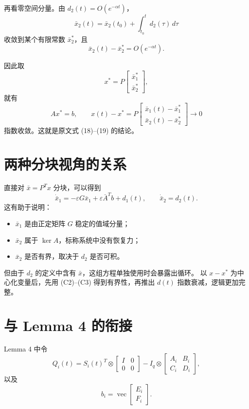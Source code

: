 \documentclass[UTF8,fontset=fandol]{ctexart}
\begin{document}
再看零空间分量。由 $d_2(t)=O(e^{-\alpha t})$，
\[
\bar{x}_2(t)
=\bar{x}_2(t_0)+\int_{t_0}^t d_2(\tau)\,d\tau
\]
收敛到某个有限常数 $\bar{x}_2^*$，且
\[
\bar{x}_2(t)-\bar{x}_2^*=O(e^{-\alpha t}).
\]

因此取
\[
x^*=P
\begin{bmatrix}
\bar{x}_1^*\\
\bar{x}_2^*
\end{bmatrix},
\]
就有
\[
Ax^*=b,\qquad
x(t)-x^*
=P
\begin{bmatrix}
\bar{x}_1(t)-\bar{x}_1^*\\
\bar{x}_2(t)-\bar{x}_2^*
\end{bmatrix}
\to0
\]
指数收敛。这就是原文式 (18)--(19) 的结论。

\section{两种分块视角的关系}

直接对 $\bar{x}=P^{T}x$ 分块，可以得到
\[
\dot{\bar{x}}_1
=-\varepsilon G\bar{x}_1+\varepsilon\bar{A}^{T}b+d_1(t),
\qquad
\dot{\bar{x}}_2=d_2(t).
\]
这有助于说明：
\begin{itemize}
  \item $\bar{x}_1$ 是由正定矩阵 $G$ 稳定的值域分量；
  \item $\bar{x}_2$ 属于 $\ker A$，标称系统中没有恢复力；
  \item $\bar{x}_2$ 是否有界，取决于 $d_2$ 是否可积。
\end{itemize}

但由于 $d_2$ 的定义中含有 $\bar{x}$，这组方程单独使用时会暴露出循环。
以 $x-x^*$ 为中心化变量后，先用 (C2)--(C3) 得到有界性，再推出 $d(t)$
指数衰减，逻辑更加完整。

\section{与 Lemma 4 的衔接}

Lemma 4 中令
\[
Q_i(t)
=S_i(t)^{T}\otimes
\begin{bmatrix}
I&0\\
0&0
\end{bmatrix}
-I_q\otimes
\begin{bmatrix}
A_i&B_i\\
C_i&D_i
\end{bmatrix},
\]
以及
\[
b_i=\operatorname{vec}
\begin{bmatrix}
E_i\\
F_i
\end{bmatrix}.
\]
\end{document}
